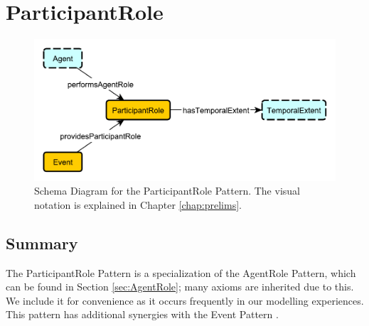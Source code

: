 \section{ParticipantRole}
\label{sec:ParticipantRole}
\begin{figure}[h!]
\begin{center}
\includegraphics[width=.8\textwidth]{figures/participantrole}
\end{center}
\caption{Schema Diagram for the ParticipantRole Pattern. The visual notation is explained in Chapter \ref{chap:prelims}.}
\label{fig:ParticipantRole}
\end{figure}
\subsection{Summary}
\label{sum:ParticipantRole}
The \textsf{ParticipantRole} Pattern is a specialization of the \textsf{AgentRole} Pattern, which can be found in Section \ref{sec:AgentRole}; many axioms are inherited due to this. We include it for convenience as it occurs frequently in our modelling experiences. This pattern has additional synergies with the \textsf{Event} Pattern \cite{event,enslave}.

